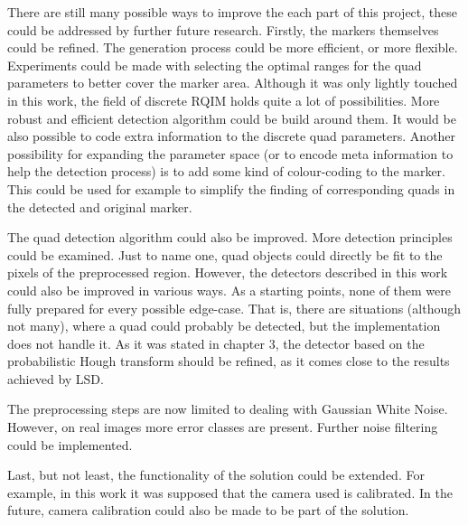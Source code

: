 There are still many possible ways to improve the each part of this project, these could be addressed by further future research.
Firstly, the markers themselves could be refined.
The generation process could be more efficient, or more flexible.
Experiments could be made with selecting the optimal ranges for the quad parameters to better cover the marker area.
Although it was only lightly touched in this work, the field of discrete RQIM holds quite a lot of possibilities.
More robust and efficient detection algorithm could be build around them.
It would be also possible to code extra information to the discrete quad parameters.
Another possibility for expanding the parameter space (or to encode meta information to help the detection process) is to add some kind of colour-coding to the marker.
This could be used for example to simplify the finding of corresponding quads in the detected and original marker.

The quad detection algorithm could also be improved.
More detection principles could be examined.
Just to name one, quad objects could directly be fit to the pixels of the preprocessed region.
However, the detectors described in this work could also be improved in various ways.
As a starting points, none of them were fully prepared for every possible edge-case.
That is, there are situations (although not many), where a quad could probably be detected, but the implementation does not handle it.
As it was stated in chapter 3, the detector based on the probabilistic Hough transform should be refined, as it comes close to the results achieved by LSD.

The preprocessing steps are now limited to dealing with Gaussian White Noise.
However, on real images more error classes are present.
Further noise filtering could be implemented.

Last, but not least, the functionality of the solution could be extended.
For example, in this work it was supposed that the camera used is calibrated.
In the future, camera calibration could also be made to be part of the solution.